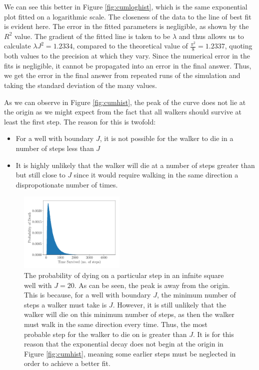 \documentclass[journal]{IEEEtran}
\begin{document}
We can see this better in Figure \ref{fig:cumloghist}, which is the same
exponential plot fitted on a logarithmic scale. The closeness of the data to the
line of best fit is evident here. The error in the fitted parameters is
negligible, as shown by the $R^2$ value. The gradient of the fitted line is
taken to be $\lambda$ and thus allows us to calculate $\lambda J^2 = 1.2334$,
compared to the theoretical value of $\frac{\pi^2}{8} = 1.2337$, quoting both
values to the precision at which they vary. Since the numerical error in the
fits is negligible, it cannot be propagated into an error in the final
answer. Thus, we get the error in the final answer from repeated runs of the
simulation and taking the standard deviation of the many values.

As we can observe in Figure \ref{fig:cumhist}, the peak of the curve does not
lie at the origin as we might expect from the fact that all walkers should
survive at least the first step. The reason for this is twofold:
\begin{itemize}
\item For a well with boundary $J$, it is not possible for the walker to die in
  a number of steps less than $J$
\item It is highly unlikely that the walker will die at a number of steps
  greater than but still close to $J$ since it would require walking in the same
  direction a dispropotionate number of times.
\end{itemize}

\begin{figure}[H]%
  \begin{center}
    \includegraphics[width=0.45\textwidth]{images/exp_plot.pdf}
    \caption{The probability of dying on a particular step in an infnite square
      well with $J=20$. As can be seen, the peak is away from the origin. This
      is because, for a well with boundary $J$, the minimum number of steps a
      walker must take is $J$. However, it is still unlikely that the walker
      will die on this minimum number of steps, as then the walker must walk in
      the same direction every time. Thus, the most probable step for the walker
      to die on is greater than $J$. It is for this reason that the exponential
      decay does not begin at the origin in Figure \ref{fig:cumhist}, meaning
      some earlier steps must be neglected in order to achieve a better fit.}
    \label{fig:hist}
  \end{center}
\end{figure}
\end{document}
